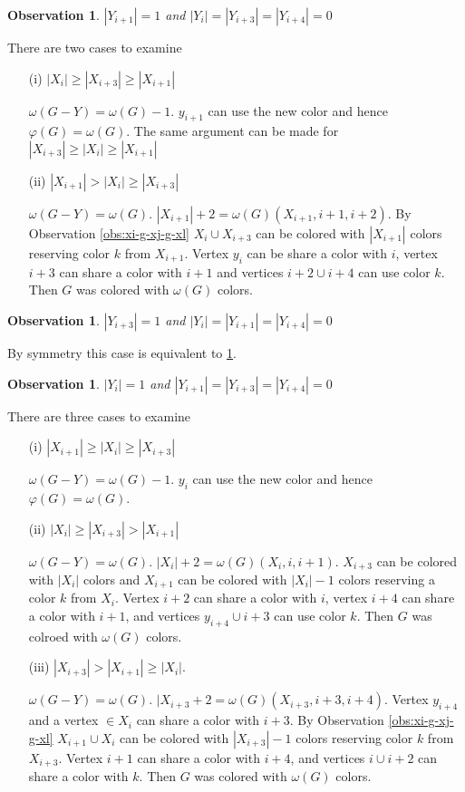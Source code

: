 \documentclass[12pt]{article}
\newtheorem{Observation}[Theorem]{Observation}
\begin{document}
\begin{Observation}\label{obs:yi1}
$|Y_{i+1}| = 1$ and $|Y_i| = |Y_{i+3}| = |Y_{i+4}| = 0$
\end{Observation}
 There are two cases to examine

	\begin{itemize}
	\item[(i)]
		$|X_i| \geq |X_{i+3}| \geq |X_{i+1}|$

		$\omega(G - Y) = \omega(G) - 1$. $y_{i+1}$ can use the new color and hence $\varphi(G) = \omega(G)$. The same argument can be made for $|X_{i+3}| \geq |X_i| \geq |X_{i+1}|$ 

	\item[(ii)]
		$|X_{i+1}| > |X_i| \geq |X_{i+3}|$

		$\omega(G - Y) = \omega(G)$. $|X_{i+1}| +2 = \omega(G) (X_{i+1}, i+1,i+2)$. By Observation \ref{obs:xi-g-xj-g-xl} $X_{i} \cup X_{i+3}$ can be colored with $|X_{i+1}|$ colors reserving color $k$ from $X_{i+1}$. Vertex $y_i$ can be share a color with $i$, vertex $i+3$ can share a color with $i+1$ and vertices $i+2 \cup i+4$ can use color $k$. Then $G$ was colored with $\omega(G)$ colors.
	\end{itemize}

\begin{Observation}\label{obs:yi3}
$|Y_{i+3}| = 1$ and $|Y_i| = |Y_{i+1}| = |Y_{i+4}| = 0$
\end{Observation}
 By symmetry this case is equivalent to \ref{obs:yi1}.

\begin{Observation}\label{obs:yi}
$|Y_{i}| = 1$ and $|Y_{i+1}| = |Y_{i+3}| = |Y_{i+4}| = 0$
\end{Observation}
 There are three cases to examine
	\begin{itemize}
		\item[(i)]
			$|X_{i+1}| \geq |X_i| \geq |X_{i+3}|$

			$\omega(G - Y) = \omega(G) - 1$. $y_{i}$ can use the new color and hence $\varphi(G) = \omega(G)$. 
		\item[(ii)]
			$|X_{i}| \geq |X_{i+3}| > |X_{i+1}|$
		
			$\omega(G - Y) = \omega(G)$. $|X_i| + 2 = \omega(G) (X_i, i, i+1)$. $X_{i+3}$ can be colored with $|X_i|$ colors and $X_{i+1}$ can be colored with $|X_i| - 1$ colors reserving a color $k$ from $X_i$. Vertex $i+2$ can share a color with $i$, vertex $i+4$ can share a color with $i+1$, and vertices $y_{i+4} \cup i+3$ can use color $k$.  Then $G$ was colroed with $\omega(G)$ colors.
		\item[(iii)]
			$|X_{i+3}| > |X_{i+1}| \geq |X_{i}|$.

			$\omega(G - Y) = \omega(G)$. $|X_{i+3} + 2 =\omega(G) (X_{i+3}, i+3, i+4)$. Vertex $y_{i+4}$ and a vertex $\in X_i$ can share a color with $i+3$. By Observation \ref{obs:xi-g-xj-g-xl} $X_{i+1} \cup X_{i}$ can be colored with $|X_{i+3}| - 1$ colors reserving color $k$ from $X_{i+3}$. Vertex $i+1$ can share a color with $i+4$, and vertices $i \cup i+2$ can share a color with $k$. Then $G$ was colored with $\omega(G)$ colors. 
	\end{itemize}
\end{document}
